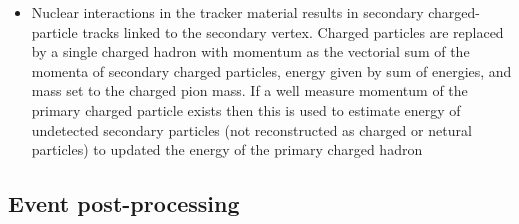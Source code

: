 \begin{itemize}
    \item Nuclear interactions in the tracker material results in secondary charged-particle tracks linked to the secondary vertex. Charged particles are replaced by a single charged hadron with momentum as the vectorial sum of the momenta of secondary charged particles, energy given by sum of energies, and mass set to the charged pion mass. If a well measure momentum of the primary charged particle exists then this is used to estimate energy of undetected secondary particles (not reconstructed as charged or netural particles) to updated the energy of the primary charged hadron
\end{itemize}


\subsection{Event post-processing}

